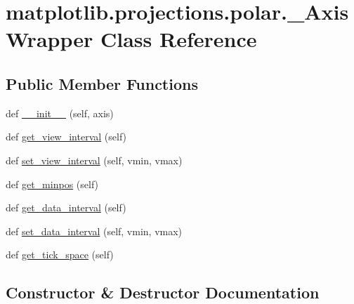\hypertarget{classmatplotlib_1_1projections_1_1polar_1_1__AxisWrapper}{}\section{matplotlib.\+projections.\+polar.\+\_\+\+Axis\+Wrapper Class Reference}
\label{classmatplotlib_1_1projections_1_1polar_1_1__AxisWrapper}
\subsection*{Public Member Functions}
\begin{DoxyCompactItemize}
\item 
def \hyperlink{classmatplotlib_1_1projections_1_1polar_1_1__AxisWrapper_a020139dc7134435862ec5226cd4ef34b}{\+\_\+\+\_\+init\+\_\+\+\_\+} (self, axis)
\item 
def \hyperlink{classmatplotlib_1_1projections_1_1polar_1_1__AxisWrapper_a0d701cadfb62812deac544bd428f55e3}{get\+\_\+view\+\_\+interval} (self)
\item 
def \hyperlink{classmatplotlib_1_1projections_1_1polar_1_1__AxisWrapper_a0aab2197685283ac9ad73f326e28e261}{set\+\_\+view\+\_\+interval} (self, vmin, vmax)
\item 
def \hyperlink{classmatplotlib_1_1projections_1_1polar_1_1__AxisWrapper_af9050f9898d5d2cb19cba3d473586787}{get\+\_\+minpos} (self)
\item 
def \hyperlink{classmatplotlib_1_1projections_1_1polar_1_1__AxisWrapper_a864e3cae7dd551055299cae84760496b}{get\+\_\+data\+\_\+interval} (self)
\item 
def \hyperlink{classmatplotlib_1_1projections_1_1polar_1_1__AxisWrapper_ac7c5fcd1b5c82a7e94e72c531e5b58c6}{set\+\_\+data\+\_\+interval} (self, vmin, vmax)
\item 
def \hyperlink{classmatplotlib_1_1projections_1_1polar_1_1__AxisWrapper_ace854f16bc5914f845fc5482f0e1846c}{get\+\_\+tick\+\_\+space} (self)
\end{DoxyCompactItemize}


\subsection{Constructor \& Destructor Documentation}
\mbox{\label{classmatplotlib_1_1projections_1_1polar_1_1__AxisWrapper_a020139dc7134435862ec5226cd4ef34b}} 
